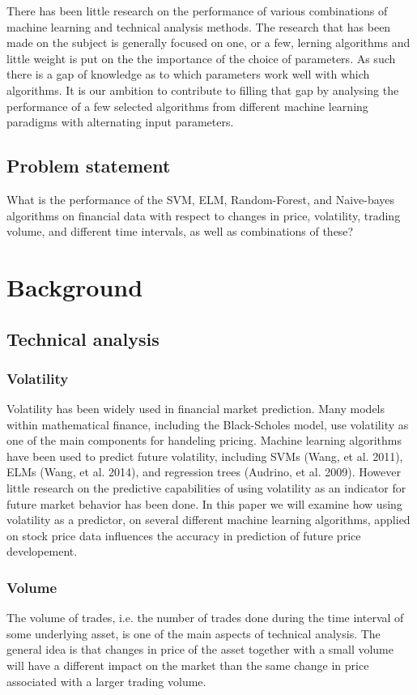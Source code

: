 \documentclass{article}
\begin{document}
There has been little research on the performance of various combinations of machine learning and technical analysis methods. The research that has been made on the subject is generally focused on one, or a few, lerning algorithms and little weight is put on the the importance of the choice of parameters. As such there is a gap of knowledge as to which parameters work well with which algorithms. It is our ambition to contribute to filling that gap by analysing the performance of a few selected algorithms from different machine learning paradigms with alternating input parameters.

\subsection{Problem statement}
What is the performance of the SVM, ELM, Random-Forest, and Naive-bayes algorithms on financial data with respect to changes in price, volatility, trading volume, and different time intervals, as well as combinations of these?


\section{Background}
\subsection{Technical analysis}
\subsubsection{Volatility}
Volatility has been widely used in financial market prediction. Many models within mathematical finance, including the Black-Scholes model, use volatility as one of the main components for handeling pricing. Machine learning algorithms have been used to predict future volatility, including SVMs (Wang, et al. 2011), ELMs (Wang, et al. 2014), and regression trees (Audrino, et al. 2009).  However little research on the predictive capabilities of using volatility as an indicator for future market behavior has been done. In this paper we will examine how using volatility as a predictor, on several different machine learning algorithms, applied on stock price data influences the accuracy in prediction of future price developement. 

\subsubsection{Volume}
The volume of trades, i.e. the number of trades done during the time interval of some underlying asset, is one of the main aspects of technical analysis. The general idea is that changes in price of the asset together with a small volume will have a different impact on the market than the same change in price associated with a larger trading volume. 
\end{document}
